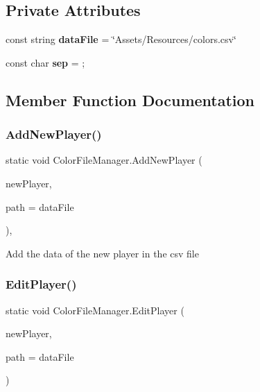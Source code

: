 \subsection*{Private Attributes}
\begin{DoxyCompactItemize}
\item 
\mbox{\label{class_color_file_manager_a9c632f9880c955e2e14821eb542fab92}} 
const string {\bfseries data\+File} = \char`\"{}Assets/Resources/colors.\+csv\char`\"{}
\item 
\mbox{\label{class_color_file_manager_a4dabe5cb92c596d72b64f69d258ba72c}} 
const char {\bfseries sep} = \textquotesingle{};\textquotesingle{}
\end{DoxyCompactItemize}


\subsection{Member Function Documentation}
\mbox{\label{class_color_file_manager_af4e55b402c15b046cd1933b32f410b94}} 
\subsubsection{\texorpdfstring{Add\+New\+Player()}{AddNewPlayer()}}
{\footnotesize\ttfamily static void Color\+File\+Manager.\+Add\+New\+Player (\begin{DoxyParamCaption}\item[{\mbox{\hyperlink{class_player_color}{Player\+Color}}}]{new\+Player,  }\item[{string}]{path = {\ttfamily dataFile} }\end{DoxyParamCaption})\hspace{0.3cm}{\ttfamily [static]}, {\ttfamily [private]}}

Add the data of the new player in the csv file \mbox{\label{class_color_file_manager_a0fb905dacc59c730d20b2f29c7c348d6}} 
\subsubsection{\texorpdfstring{Edit\+Player()}{EditPlayer()}}
{\footnotesize\ttfamily static void Color\+File\+Manager.\+Edit\+Player (\begin{DoxyParamCaption}\item[{\mbox{\hyperlink{class_player_color}{Player\+Color}}}]{new\+Player,  }\item[{string}]{path = {\ttfamily dataFile} }\end{DoxyParamCaption})\hspace{0.3cm}{\ttfamily [static]}}

